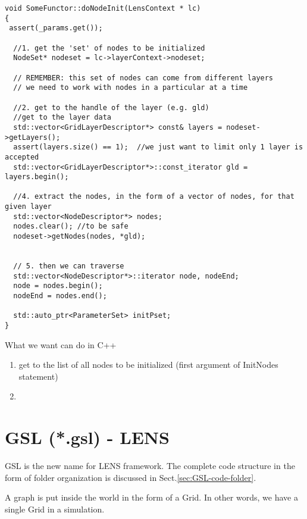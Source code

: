 \begin{lstlisting}
void SomeFunctor::doNodeInit(LensContext * lc) 
{
 assert(_params.get());
 
  //1. get the 'set' of nodes to be initialized
  NodeSet* nodeset = lc->layerContext->nodeset;

  // REMEMBER: this set of nodes can come from different layers
  // we need to work with nodes in a particular at a time
  
  //2. get to the handle of the layer (e.g. gld)
  //get to the layer data
  std::vector<GridLayerDescriptor*> const& layers = nodeset->getLayers();
  assert(layers.size() == 1);  //we just want to limit only 1 layer is accepted
  std::vector<GridLayerDescriptor*>::const_iterator gld = layers.begin();
  
  //4. extract the nodes, in the form of a vector of nodes, for that given layer
  std::vector<NodeDescriptor*> nodes;
  nodes.clear(); //to be safe
  nodeset->getNodes(nodes, *gld);
 
 
  // 5. then we can traverse
  std::vector<NodeDescriptor*>::iterator node, nodeEnd;
  node = nodes.begin();
  nodeEnd = nodes.end();
  
  std::auto_ptr<ParameterSet> initPset;
}
\end{lstlisting}

What we want can do in C++
\begin{enumerate}
  \item get to the list of all nodes to be initialized (first argument of
  InitNodes statement)
  
  \item 
\end{enumerate}

\section{GSL (*.gsl) - LENS}
\label{sec:GSL}
\label{sec:nts-graph}

GSL is the new name for LENS framework.
The complete code structure in the form of folder organization is discussed in
Sect.\ref{sec:GSL-code-folder}. 


A graph is put inside the world in the form of a Grid. In other words, we have a
single Grid in a simulation.



